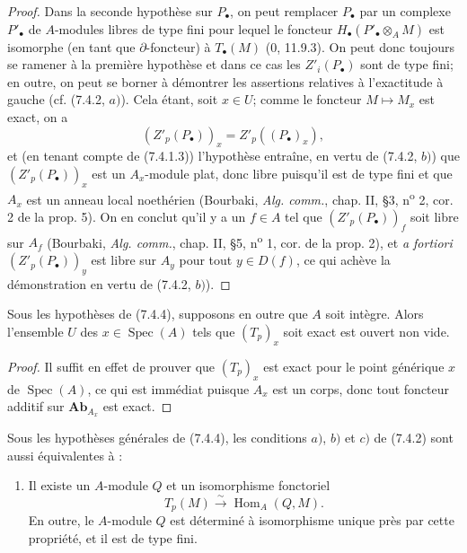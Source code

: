 \begin{proof}
Dans la seconde hypothèse sur $P_\bullet$, on peut remplacer $P_\bullet$ par
un complexe $P'_\bullet$ de
$A$-modules libres de type fini pour lequel le foncteur
$H_\bullet(P'_\bullet\otimes_A M)$ est isomorphe (en tant que
$\partial$-foncteur) à $T_\bullet(M)$ (0, 11.9.3). On peut donc toujours se
ramener à la première hypothèse et dans ce cas les $Z'_i(P_\bullet)$ sont de
type fini; en outre, on peut se borner à démontrer les assertions relatives à
l'exactitude à gauche (cf. (7.4.2, $a)$). Cela étant, soit $x\in U$; comme le
foncteur $M\mapsto M_x$ est exact, on a
\[
  (Z'_p(P_\bullet))_x=Z'_p((P_\bullet)_x),
\]
et (en tenant compte de (7.4.1.3)) l'hypothèse entraîne, en vertu de
(7.4.2, $b)$) que $(Z'_p(P_\bullet))_x$ est un $A_x$-module plat, donc libre
puisqu'il est de type fini et que $A_x$ est un anneau local noethérien
(Bourbaki, \emph{Alg. comm.}, chap. II, \S 3, n\textsuperscript{o} 2, cor. 2
de la prop. 5). On en conclut qu'il y a un $f\in A$ tel que
$(Z'_p(P_\bullet))_f$ soit libre sur $A_f$ (Bourbaki, \emph{Alg. comm.},
chap. II, \S 5, n\textsuperscript{o} 1, cor. de la prop. 2), et \emph{a
fortiori} $(Z'_p(P_\bullet))_y$ est libre sur $A_y$ pour tout $y\in D(f)$, ce
qui achève la démonstration en vertu de (7.4.2, $b)$).
\end{proof}

\begin{corollary}[7.4.5]
Sous les hypothèses de (7.4.4), supposons en outre que $A$ soit intègre. Alors
l'ensemble $U$ des $x\in\operatorname{Spec}(A)$ tels que $(T_p)_x$ soit exact
est ouvert non vide.
\end{corollary}

\begin{proof}
Il suffit en effet de prouver que $(T_p)_x$ est exact pour le point générique
$x$ de $\operatorname{Spec}(A)$, ce qui est immédiat puisque $A_x$ est un
corps, donc tout foncteur additif sur $\mathbf{Ab}_{A_x}$ est exact.
\end{proof}

\begin{proposition}[7.4.6]
Sous les hypothèses générales de (7.4.4), les conditions $a)$, $b)$ et $c)$ de
(7.4.2) sont aussi équivalentes à :
\begin{enumerate}
  \item[d)] Il existe un $A$-module $Q$ et un isomorphisme fonctoriel
    \[
      T_p(M)\xrightarrow{\sim}\operatorname{Hom}_A(Q,M).
      \tag{7.4.6.1}\label{III.7.4.6.1.fr}
    \]
    En outre, le $A$-module $Q$ est déterminé à isomorphisme unique près par
    cette propriété, et il est de type fini.
\end{enumerate}
\end{proposition}

